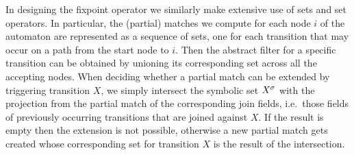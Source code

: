 In designing the fixpoint operator we similarly make extensive use of sets and 
set operators.
In particular, the (partial) matches we compute for each node $i$ of the 
automaton are represented as a sequence of sets, one for each transition that 
may occur on a path from the start node to $i$.
Then the abstract filter for a specific transition can be obtained by unioning 
its corresponding set across all the accepting nodes.
When deciding whether a partial match can be extended by triggering transition 
$X$, we simply intersect the symbolic set ${X}^{\sigma}$ with the projection from 
the partial match of the corresponding join fields, i.e.\ those fields of 
previously occurring transitions that are joined against $X$.
If the result is empty then the extension is not possible, otherwise a new 
partial match gets created whose corresponding set for transition $X$ is the 
result of the intersection.   





 
